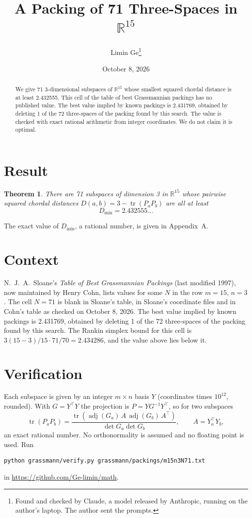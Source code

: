 \documentclass[11pt,a4paper]{article}
\title{A Packing of 71 Three-Spaces in $\mathbb{R}^{15}$}
\author{Limin Ge\thanks{Found and checked by Claude, a model released by Anthropic, running on the author's laptop. The author sent the prompts.}}
\date{October 8, 2026}
\newtheorem*{theorem}{Theorem}
\begin{document}
\maketitle
\begin{abstract}
We give 71 3-dimensional subspaces of $\mathbb{R}^{15}$ whose smallest squared chordal distance is at least 2.432555. This cell of the table of best Grassmannian packings has no published value. The best value implied by known packings is 2.431769, obtained by deleting 1 of the 72 three-spaces of the packing found by this search. The value is checked with exact rational arithmetic from integer coordinates. We do not claim it is optimal.
\end{abstract}

\section{Result}
\begin{theorem}
There are 71 subspaces of dimension 3 in $\mathbb{R}^{15}$ whose pairwise squared chordal distances $D(a,b) = 3 - \operatorname{tr}(P_aP_b)$ are all at least
\[ D_{\min} = 2.432555\ldots \]
\end{theorem}
The exact value of $D_{\min}$, a rational number, is given in Appendix~A.


\section{Context}
N.~J.~A.~Sloane's \emph{Table of Best Grassmannian Packings} (last modified 1997), now maintained by Henry Cohn, lists values for some $N$ in the row $m=15$, $n=3$. The cell $N=71$ is blank in Sloane's table, in Sloane's coordinate files and in Cohn's table as checked on October 8, 2026. The best value implied by known packings is 2.431769, obtained by deleting 1 of the 72 three-spaces of the packing found by this search. The Rankin simplex bound for this cell is $3(15-3)/15\cdot 71/70 = 2.434286$, and the value above lies below it.


\section{Verification}
Each subspace is given by an integer $m\times n$ basis $Y$ (coordinates times $10^{12}$, rounded). With $G=Y^\top Y$ the projection is $P=YG^{-1}Y^\top$, so for two subspaces
\[ \operatorname{tr}(P_aP_b)=\frac{\operatorname{tr}(\operatorname{adj}(G_a)\,A\,\operatorname{adj}(G_b)\,A^\top)}{\det G_a\det G_b},\qquad A=Y_a^\top Y_b, \]
an exact rational number. No orthonormality is assumed and no floating point is used. Run
\begin{verbatim}
python grassmann/verify.py grassmann/packings/m15n3N71.txt
\end{verbatim}
in \url{https://github.com/Ge-limin/math}.
\end{document}
